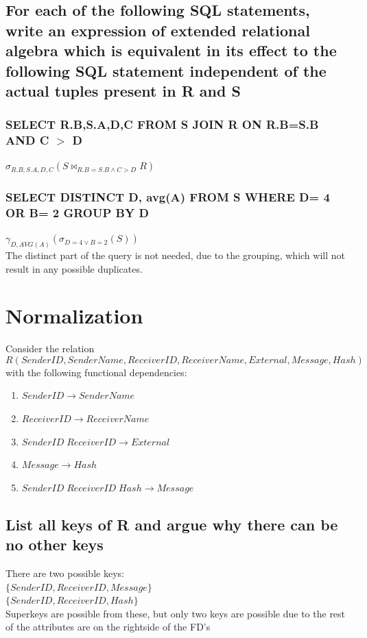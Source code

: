 \documentclass[12pt, a4paper]{article}
\begin{document}
		\subsection{For each of the following SQL statements, write an expression of extended relational algebra which is equivalent in its effect to the following SQL statement independent of the actual tuples present in R and S}
			\subsubsection{SELECT R.B,S.A,D,C FROM S JOIN R ON R.B=S.B AND C $>$ D}
				$\sigma_{R.B,S.A,D,C}(S\bowtie_{R.B=S.B\land C>D}R)$
			\subsubsection{SELECT DISTINCT D, avg(A) FROM S WHERE D= 4 OR B= 2 GROUP BY D}
				$\gamma_{D,AVG(A)}(\sigma_{D=4\lor B=2}(S))$\\
				The distinct part of the query is not needed, due to the grouping, which will not result in any possible duplicates.
	\clearpage
	\section{Normalization}
		Consider the relation
			$$R(SenderID,SenderName,ReceiverID, ReceiverName, External, Message, Hash)$$
		with the following functional dependencies:
		\begin{enumerate}
			\item $SenderID\rightarrow SenderName$
			\item $ReceiverID \rightarrow ReceiverName$
			\item $SenderID\;ReceiverID \rightarrow External$
			\item $Message \rightarrow Hash$
			\item $SenderID\;ReceiverID\;Hash\rightarrow Message$
		\end{enumerate}
		\subsection{List all keys of R and argue why there can be no other keys}
			There are two possible keys:\\
			$\{SenderID,ReceiverID,Message\}$\\
			$\{SenderID,ReceiverID,Hash\}$\\
			Superkeys are possible from these, but only two keys are possible due to the rest of the attributes are on the rightside of the FD's
\end{document}
